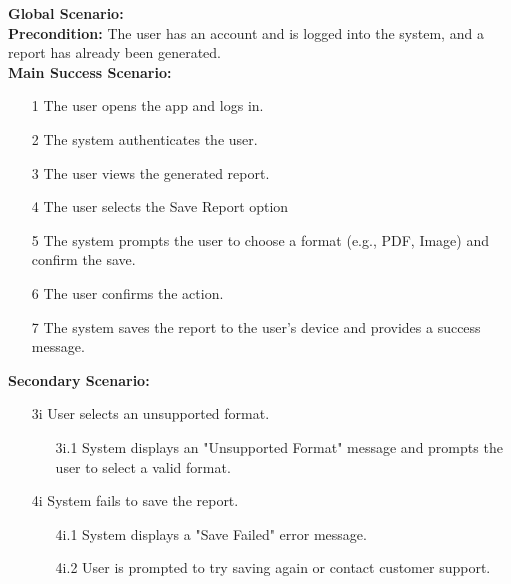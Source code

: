 \documentclass[]{article}
\begin{document}
\begin{enumerate}[{\bf BE1.}]
\textbf{Global Scenario:} \\
    \textbf{Precondition:} The user has an account and is logged into the system, and a report has already been generated. \\
    \textbf{Main Success Scenario:}
            \begin{enumerate}
                \item[1] The user opens the app and logs in.
                \item[2] The system authenticates the user.
                \item[3] The user views the generated report.
                \item[4] The user selects the Save Report option
                \item[5] The system prompts the user to choose a format (e.g., PDF, Image) and confirm the save.
                \item[6] The user confirms the action.
                \item[7] The system saves the report to the user’s device and provides a success message.
            \end{enumerate}

            \textbf{Secondary Scenario:}
            \begin{enumerate}
                \item[3i] User selects an unsupported format.
                \begin{enumerate}
                    \item[3i.1] System displays an "Unsupported Format" message and prompts the user to select a valid format.
                \end{enumerate}
                \item[4i] System fails to save the report.
                \begin{enumerate}
                    \item[4i.1] System displays a "Save Failed" error message.
                    \item[4i.2] User is prompted to try saving again or contact customer support.
                \end{enumerate}
            \end{enumerate}
    

\end{enumerate}
\end{document}
